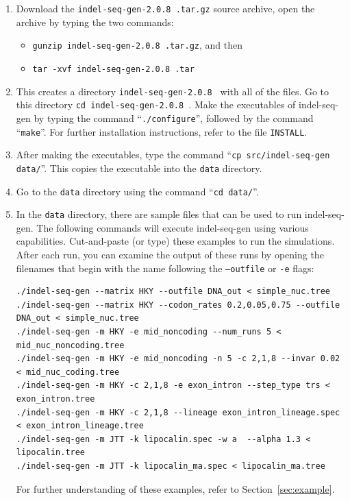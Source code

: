 \documentclass[10pt]{article}
\newcommand{\version}{2.0.8 }
\newcommand{\iSGcurrent}{indel-seq-gen-\version }
\newcommand{\iSGcurrentshort}{iSGv\version }
\begin{document}
\begin{enumerate}
\item Download the {\tt \iSGcurrent.tar.gz} source archive, open the archive by typing the two commands:
 \begin{itemize}
 \item[] {\tt gunzip \iSGcurrent.tar.gz}, and then
 \item[] {\tt tar -xvf \iSGcurrent.tar}
 \end{itemize}
\item This creates a directory {\tt \iSGcurrent} with all of the files.  Go to this directory {\tt cd \iSGcurrent}. Make the executables of indel-seq-gen by typing the command ``{\tt ./configure}'', followed by the command ``{\tt make}''. For further installation instructions, refer to the file {\tt INSTALL}. 
\item After making the executables, type the command ``{\tt cp src/indel-seq-gen data/}''. This copies the executable into the {\tt data} directory.
\item Go to the {\tt data} directory using the command ``{\tt cd data/}''.
\item In the {\tt data} directory, there are sample files that can be used to run indel-seq-gen. The following commands will execute indel-seq-gen using various capabilities. Cut-and-paste (or type) these examples to run the simulations. After each run, you can examine the output of these runs by opening the filenames that begin with the name following the {\tt --outfile} or {\tt -e} flags:
\begin{verbatim}
./indel-seq-gen --matrix HKY --outfile DNA_out < simple_nuc.tree
./indel-seq-gen --matrix HKY --codon_rates 0.2,0.05,0.75 --outfile DNA_out < simple_nuc.tree
./indel-seq-gen -m HKY -e mid_noncoding --num_runs 5 < mid_nuc_noncoding.tree
./indel-seq-gen -m HKY -e mid_noncoding -n 5 -c 2,1,8 --invar 0.02 < mid_nuc_coding.tree
./indel-seq-gen -m HKY -c 2,1,8 -e exon_intron --step_type trs < exon_intron.tree
./indel-seq-gen -m HKY -c 2,1,8 --lineage exon_intron_lineage.spec < exon_intron_lineage.tree
./indel-seq-gen -m JTT -k lipocalin.spec -w a  --alpha 1.3 < lipocalin.tree
./indel-seq-gen -m JTT -k lipocalin_ma.spec < lipocalin_ma.tree
\end{verbatim}
 For further understanding of these examples, refer to Section~\ref{sec:example}.

\end{enumerate}
\end{document}
